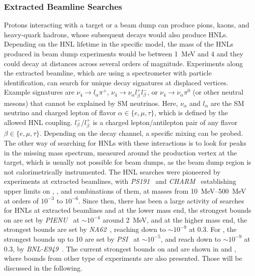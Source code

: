 \subsubsection{Extracted Beamline Searches}

Protons interacting with a target or a beam dump can produce pions, kaons, and heavy-quark hadrons, whose subsequent decays would also produce HNLs. Depending on the HNL lifetime in the specific model, the mass of the HNLs produced in beam dump experiments would be between \SI{1}{\mega\electronvolt} and \SI{4}{\gev} and they could decay at distances across several orders of magnitude. Experiments along the extracted beamline, which are using a spectrometer with particle identification, can search for unique decay signatures at displaced vertices. Example signatures are $\nu_4 \rightarrow l_\alpha \pi^+$, $\nu_4 \rightarrow \nu_\alpha l^+_\beta l^-_\beta$, or $\nu_4 \rightarrow \nu_\alpha \pi^0$ (or other neutral mesons) that cannot be explained by SM neutrinos. Here, $\nu_\alpha$ and $l_\alpha$ are the SM neutrino and charged lepton of flavor $\alpha \in \{e,\mu,\tau\}$, which is defined by the allowed HNL coupling. $l^-_\beta$/$l^+_\beta$ is a charged lepton/antilepton pair of any flavor $\beta \in \{e,\mu,\tau\}$. Depending on the decay channel, a specific mixing can be probed. The other way of searching for HNLs with these interactions is to look for peaks in the missing mass spectrum, measured around the production vertex at the target, which is usually not possible for beam dumps, as the beam dump region is not calorimetrically instrumented. The HNL searches were pioneered by experiments at extracted beamlines, with \textit{PS191}~ and \textit{CHARM}~ establishing upper limits on , , and combinations of them, at masses from \SIrange{10}{500}{\mega\electronvolt} at orders of $10^{-3}$ to $10^{-6}$. Since then, there has been a large activity of searches for HNLs at extracted beamlines and at the lower mass end, the strongest bounds on  are set by \textit{PIENU}~ at $\sim10^{-4}$ around \SI{2}{\mega\electronvolt}, and at the higher mass end, the strongest bounds are set by \textit{NA62}~, reaching down to $\sim10^{-9}$ at \SI{0.3}{\gev}. For , the strongest bounds up to \SI{10}{\gev} are set by \textit{PSI}~ at $\sim10^{-5}$, and reach down to $\sim10^{-9}$ at \SI{0.3}{\gev}, by \textit{BNL-E949}~. The current strongest bounds on  and  are shown in  and , where bounds from other type of experiments are also presented. Those will be discussed in the following.

